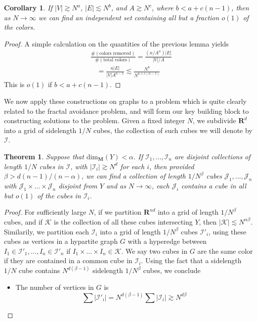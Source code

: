 \documentclass{article}
\theoremstyle{plain}
\newtheorem*{corollary}{Corollary}
\theoremstyle{plain}
\newtheorem{theorem}{Theorem}
\begin{document}
\begin{multicols}{2}
\begin{corollary}
	If $|V| \gtrsim N^a$, $|E| \lesssim N^b$, and $A \gtrsim N^c$, where $b < a + c(n-1)$, then as $N \to \infty$ we can find an independent set containing all but a fraction $o(1)$ of the colors.
\end{corollary}
\begin{proof}
	A simple calculation on the quantities of the previous lemma yields
	\begin{align*}
		&\frac{\# ( \text{colors removed} )}{\# ( \text{total colors} )} = \frac{(n/A^n)|E|}{|V|/A}\\
		&\ \ \ \ = \frac{n|E|}{|V|A^{n-1}} \lesssim \frac{N^b}{N^{a + c(n-1)}}
	\end{align*}
	This is $o(1)$ if $b < a + c(n-1)$.
\end{proof}

We now apply these constructions on graphs to a problem which is quite clearly related to the fractal avoidance problem, and will form our key building block to constructing solutions to the problem. Given a fixed integer $N$, we subdivide $\mathbf{R}^d$ into a grid of sidelength $1/N$ cubes, the collection of such cubes we will denote by $\mathcal{I}$.

\begin{theorem}
	Suppose that $\text{dim}_{\mathbf{M}}(Y) < \alpha$. If $\mathcal{I}_1, \dots, \mathcal{I}_n$ are disjoint collections of length $1/N$ cubes in $\mathcal{I}$, with $|\mathcal{I}_i| \gtrsim N^d$ for each $i$, then provided $\beta > d(n-1)/(n-\alpha)$, we can find a collection of length $1/N^\beta$ cubes $\mathcal{J}_1, \dots, \mathcal{J}_n$ with $\mathcal{J}_1 \times \dots \times \mathcal{J}_n$ disjoint from $Y$ and as $N \to \infty$, each $\mathcal{J}_i$ contains a cube in all but $o(1)$ of the cubes in $\mathcal{I}_i$.
\end{theorem}
\begin{proof}
	For sufficiently large $N$, if we partition $\mathbf{R}^{nd}$ into a grid of length $1/N^\beta$ cubes, and if $\mathcal{K}$ is the collection of all these cubes intersecting $Y$, then $|\mathcal{K}| \lesssim N^{\alpha \beta}$. Similarily, we partition each $\mathcal{I}_i$ into a grid of length $1/N^\beta$ cubes $\mathcal{I}'_i$, using these cubes as vertices in a hypartite graph $G$ with a hyperedge between $I_1 \in \mathcal{I}'_1, \dots, I_n \in \mathcal{I}'_n$ if $I_1 \times \dots \times I_n \in \mathcal{K}$. We say two cubes in $G$ are the same color if they are contained in a common cube in $\mathcal{I}_i$. Using the fact that a sidelength $1/N$ cube contains $N^{d(\beta - 1)}$ sidelength $1/N^\beta$ cubes, we conclude
	\begin{itemize}
		\item The number of vertices in $G$ is
		\[ \sum |\mathcal{I}'_i| = N^{d(\beta - 1)} \sum |\mathcal{I}_i| \gtrsim N^{d \beta} \]


\end{itemize}
\end{proof}
\end{multicols}
\end{document}
